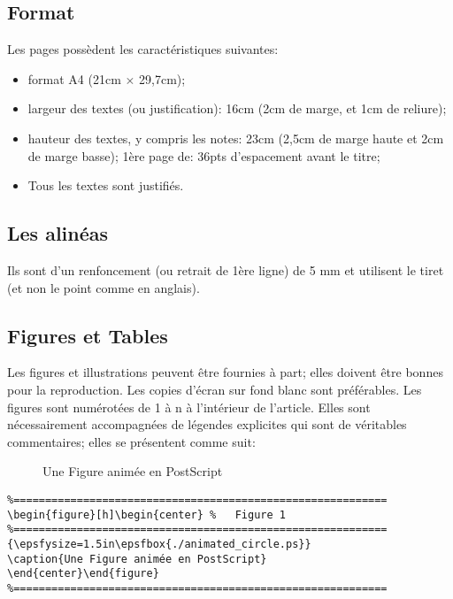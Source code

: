 \documentclass[twoside]{article}
\begin{document}
\subsection{Format}

Les pages possèdent les caractéristiques suivantes:
\begin{itemize}
\item format A4 (21cm $\times$ 29,7cm);
\item largeur des textes (ou justification): 16cm (2cm de marge, et 1cm de 
	reliure);
\item hauteur des textes, y compris les notes: 23cm (2,5cm de marge haute et 
	2cm de marge basse); 1ère page de: 36pts d'espacement avant
	le titre;
\item Tous les textes sont justifiés.
\end{itemize}


\subsection{Les alinéas}

Ils sont d'un renfoncement (ou retrait de 1ère ligne) de 5 mm et
utilisent le tiret (et non le point comme en anglais).

\subsection{Figures et Tables}

Les figures et illustrations peuvent \^etre fournies \`a part; elles
doivent \^etre bonnes pour la reproduction. Les copies d'\'ecran sur
fond blanc sont pr\'ef\'erables. Les figures sont num\'erot\'ees de 1
\`a n \`a l'int\'erieur de l'article. Elles sont n\'ecessairement
accompagn\'ees de l\'egendes explicites qui sont de véritables
commentaires; elles se pr\'esentent comme suit:

\begin{figure}[h]\begin{center} %
{\epsfysize=1.5in}
\caption{Une Figure animée en PostScript}
\end{center}\end{figure}

\begin{verbatim}
%===========================================================
\begin{figure}[h]\begin{center} %   Figure 1
%===========================================================
{\epsfysize=1.5in\epsfbox{./animated_circle.ps}}
\caption{Une Figure animée en PostScript}
\end{center}\end{figure}
%===========================================================
\end{verbatim}
\end{document}
